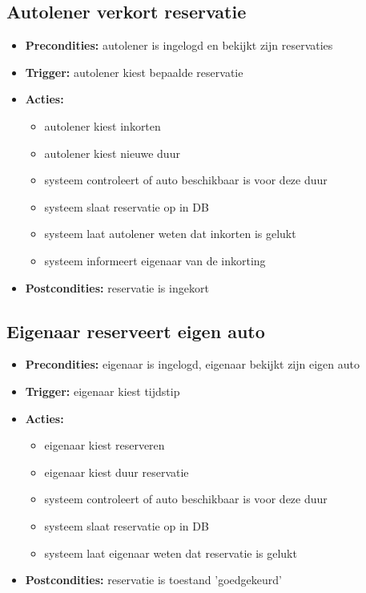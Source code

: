 \documentclass[11pt,a4paper,oneside]{article}
\begin{document}
\subsection{Autolener verkort reservatie}
\begin{itemize}
\item \textbf{Precondities:} autolener is ingelogd en bekijkt zijn reservaties \item \textbf{Trigger:} autolener kiest bepaalde reservatie
\item \textbf{Acties:} \begin{itemize}
\item	autolener kiest inkorten
\item	autolener kiest nieuwe duur
\item	systeem controleert of auto beschikbaar is voor deze duur
\item	systeem slaat reservatie op in DB
\item      systeem laat autolener weten dat inkorten is gelukt
\item      systeem informeert eigenaar van de inkorting
\end{itemize}
\item \textbf{Postcondities:} reservatie is ingekort
\end{itemize}

\subsection{Eigenaar reserveert eigen auto}
\begin{itemize}
\item \textbf{Precondities:} eigenaar is ingelogd, eigenaar bekijkt zijn eigen auto
\item \textbf{Trigger:} eigenaar kiest tijdstip
\item \textbf{Acties:} \begin{itemize}
\item	eigenaar kiest reserveren
\item 	eigenaar kiest duur reservatie
\item	systeem controleert of auto beschikbaar is voor deze duur
\item	systeem slaat reservatie op in DB
\item      systeem laat eigenaar weten dat reservatie is gelukt
\end{itemize}
\item \textbf{Postcondities:} reservatie is toestand 'goedgekeurd'
\end{itemize}
\end{document}
